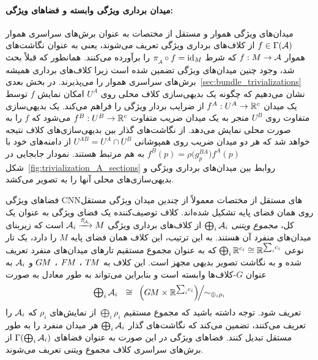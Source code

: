 \paragraph{میدان برداری ویژگی وابسته و فضاهای ویژگی:}
میدان‌های ویژگی هموار و مستقل از مختصات به عنوان برش‌های سراسری هموار $f\in\Gamma(\mathcal{A})$ از کلاف‌های برداری ویژگی تعریف می‌شوند، یعنی به عنوان نگاشت‌های هموار $f:M\to\mathcal{A}$ که شرط $\piA\circ f=\id_M$ را برآورده می‌کنند.
همانطور که قبلاً بحث شد، وجود چنین میدان‌های ویژگی تضمین شده است زیرا کلاف‌های برداری همیشه برش‌های سراسری هموار را می‌پذیرند.
در بخش بعدی~\ref{sec:bundle_trivializations} نشان می‌دهیم که چگونه یک بدیهی‌سازی کلاف محلی روی $U^A$ امکان نمایش $f$ توسط یک میدان $f^A:U^A\to\mathbb{R}^c$ از ضرایب بردار ویژگی را فراهم می‌کند.
یک بدیهی‌سازی متفاوت روی $U^B$ منجر به یک میدان ضریب متفاوت $f^B:U^B\to\mathbb{R}^c$ می‌شود که $f$ را به صورت محلی نمایش می‌دهد.
از نگاشت‌های گذار بین بدیهی‌سازی‌های کلاف نتیجه خواهد شد که هر دو میدان ضریب روی همپوشانی $U^{AB}=U^A\cap U^B$ از دامنه‌های خود با $f^B(p)=\rho\big(g_p^{BA}\big) f^A(p)$ به هم مرتبط هستند.
نمودار جابجایی در شکل~\ref{fig:trivialization_A_sections} روابط بین میدان‌های برداری ویژگی و بدیهی‌سازی‌های محلی آنها را به تصویر می‌کشد.


فضاهای ویژگی CNNهای مستقل از مختصات معمولاً از چندین میدان ویژگی مستقل روی همان فضای پایه تشکیل شده‌اند.
کلاف توصیف‌کننده یک فضای ویژگی به عنوان یک کل، \emph{مجموع ویتنی} $\bigoplus_i\mathcal{A}_i$ از کلاف‌های برداری ویژگی $\A_i\xrightarrow{\scalebox{.85}{$\pi_{\scalebox{.6}{$\!\A_i$}}$}}M$ است که زیربنای میدان‌های منفرد آن هستند.
به این ترتیب، این کلاف همان فضای پایه $M$ را دارد، یک تار نوعی $\bigoplus_i\mathbb{R}^{c_i} \cong \mathbb{R}^{\sum_i\!c_i}$ که به عنوان مجموع مستقیم تارهای میدان‌های منفرد تعریف شده و به نگاشت تصویر بدیهی مجهز است.
این کلاف به $T\mkern-1.5muM$ ، $F\mkern-1.5muM$ ، $G\mkern-1.4muM$ و $\mathcal{A}_i$ به عنوان $G$-کلاف‌ها وابسته است و بنابراین می‌تواند به طور معادل به صورت
\begin{align}
	\scalebox{1.1}{$\bigoplus$}_i\,\A_i\ \ \cong\,\ \left(\GM\times\R^{\sum_i\!c_i}\right)\!\!\Big/\!\!\sim_{\oplus_i\rho_i}
\end{align}
تعریف شود.
توجه داشته باشید که مجموع مستقیم $\bigoplus_i\rho_i$ از نمایش‌های $\rho_i$ که $\mathcal{A}_i$ را تعریف می‌کنند، تضمین می‌کند که نگاشت‌های گذار $\bigoplus_i\mathcal{A}_i$ هر میدان منفرد را به طور مستقل تبدیل کنند.
فضاهای ویژگی در این صورت به عنوان فضاهای $\Gamma\!\left(\bigoplus_i\mathcal{A}_i\right)$ از برش‌های سراسری کلاف مجموع ویتنی تعریف می‌شوند.